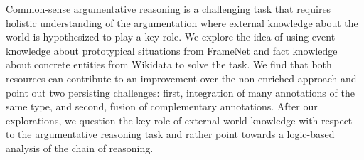 Common-sense argumentative reasoning is a challenging task that requires holistic understanding of the argumentation where external knowledge about the world is hypothesized to play a key role. We explore the idea of using event knowledge about prototypical situations from FrameNet and fact knowledge about concrete entities from Wikidata to solve the task. We find that both resources can contribute to an improvement over the non-enriched approach and point out two persisting challenges: first, integration of many annotations of the same type, and second, fusion of complementary annotations. After our explorations, we question the key role of external world knowledge with respect to the argumentative reasoning task and rather point towards a logic-based analysis of the chain of reasoning.
